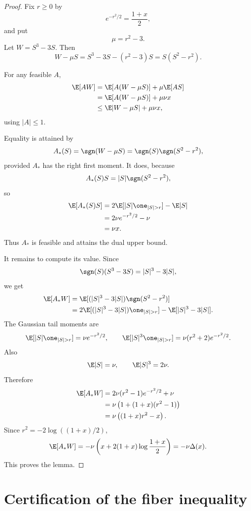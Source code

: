 \begin{proof}
Fix $r\ge0$ by
\[
        e^{-r^2/2}=\frac{1+x}{2},
\]
and put
\[
        \mu=r^2-3.
\]
Let $W=S^3-3S$. Then
\[
        W-\mu S=S^3-3S-(r^2-3)S=S(S^2-r^2).
\]

For any feasible $A$,
\begin{align*}
        \E[AW]
        &=\E[A(W-\mu S)]+\mu\E[AS]\\
        &=\E[A(W-\mu S)]+\mu\nu x\\
        &\le \E|W-\mu S|+\mu\nu x,
\end{align*}
using $|A|\le1$.

Equality is attained by
\[
        A_*(S)=\sgn(W-\mu S)=\sgn(S)\sgn(S^2-r^2),
\]
provided $A_*$ has the right first moment. It does, because
\[
        A_*(S)S=|S|\sgn(S^2-r^2),
\]
so
\begin{align*}
        \E[A_*(S)S]
        &=2\E[|S|\one_{|S|>r}]-\E|S|\\
        &=2\nu e^{-r^2/2}-\nu\\
        &=\nu x.
\end{align*}
Thus $A_*$ is feasible and attains the dual upper bound.

It remains to compute its value. Since
\[
        \sgn(S)(S^3-3S)=|S|^3-3|S|,
\]
we get
\begin{align*}
        \E[A_*W]
        &=\E[(|S|^3-3|S|)\sgn(S^2-r^2)]\\
        &=2\E[(|S|^3-3|S|)\one_{|S|>r}]
          -\E[|S|^3-3|S|].
\end{align*}
The Gaussian tail moments are
\[
        \E[|S|\one_{|S|>r}]=\nu e^{-r^2/2},
        \qquad
        \E[|S|^3\one_{|S|>r}]=\nu(r^2+2)e^{-r^2/2}.
\]
Also
\[
        \E|S|=\nu,
        \qquad
        \E|S|^3=2\nu.
\]
Therefore
\begin{align*}
        \E[A_*W]
        &=2\nu(r^2-1)e^{-r^2/2}+\nu\\
        &=\nu\left(1+(1+x)(r^2-1)\right)\\
        &=\nu\left((1+x)r^2-x\right).
\end{align*}
Since $r^2=-2\log((1+x)/2)$,
\[
        \E[A_*W]
        =-\nu\left(x+2(1+x)\log\frac{1+x}{2}\right)
        =-\nu\Delta(x).
\]
This proves the lemma.
\end{proof}


\section{Certification of the fiber inequality}
\label{app:fiber-certificate}

